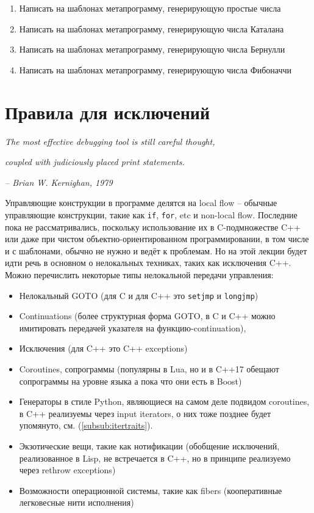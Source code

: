 \documentclass[a4paper,12pt,oneside]{article}
\begin{document}
\begin{enumerate}
\item
Написать на шаблонах метапрограмму, генерирующую простые числа

\item
Написать на шаблонах метапрограмму, генерирующую числа Каталана

\item
Написать на шаблонах метапрограмму, генерирующую числа Бернулли 

\item
Написать на шаблонах метапрограмму, генерирующую числа Фибоначчи

\end{enumerate}

\pagebreak
\section{Правила для исключений}

\hfill\textit{The most effective debugging tool is still careful thought,}

\hfill\textit{coupled with judiciously placed print statements.}{\vspace{0.5em}}

\hfill\textit{-- Brian W. Kernighan, 1979}

Управляющие конструкции в программе делятся на local flow -- обычные управляющие конструкции, такие как \lstinline!if!, \lstinline!for!, etc и non-local flow. Последние пока не рассматривались, поскольку использование их в C-подмножестве C++ или даже при чистом объектно-ориентированном программировании, в том числе и с шаблонами, обычно не нужно и ведёт к проблемам. Но на этой лекции будет идти речь в основном о нелокальных техниках, таких как исключения C++. Можно перечислить некоторые типы нелокальной передачи управления:

\begin{itemize}
\item
Нелокальный GOTO (для C и для C++ это \lstinline!setjmp! и \lstinline!longjmp!)
\item
Continuations (более структурная форма GOTO, в C и C++ можно имитировать передачей указателя на функцию-continuation), 
\item
Исключения (для C++ это C++ exceptions)
\item
Coroutines, сопрограммы (популярны в Lua, но и в C++17 обещают сопрограммы на уровне языка а пока что они есть в Boost)
\item
Генераторы в стиле Python, являющиеся на самом деле подвидом coroutines, в C++ реализуемы через input iterators, о них тоже позднее будет упомянуто, см. (\ref{subsub:itertraits}).
\item
Экзотические вещи, такие как нотификации (обобщение исключений, реализованное в Lisp, не встречается в C++, но в принципе реализуемо через rethrow exceptions)
\item
Возможности операционной системы, такие как fibers (кооперативные легковесные нити исполнения)
\end{itemize}
\end{document}

